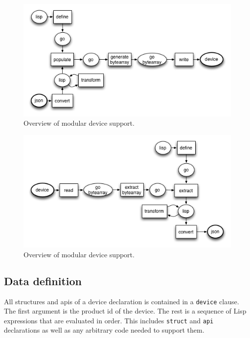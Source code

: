 \documentclass[12pt]{article}
\begin{document}
\begin{figure}[htbp] %
   \centering
   \includegraphics[width=5in]{todevice.png} 
\caption{Overview of modular device support.}
\label{fig:todevice}
\end{figure}

\begin{figure}[htbp] %
   \centering
   \includegraphics[width=5in]{fromdevice.png} 
\caption{Overview of modular device support.}
\label{fig:fromdevice}
\end{figure}

\subsection{Data definition}
\label{sec:datadefinition}

All structures and apis of a device declaration is contained in a
\verb|device| clause. The first argument is the product id of the
device. The rest is a sequence of Lisp expressions that are evaluated
in order. This includes \verb|struct| and \verb|api| declarations as
well as any arbitrary code needed to support them.
\end{document}
